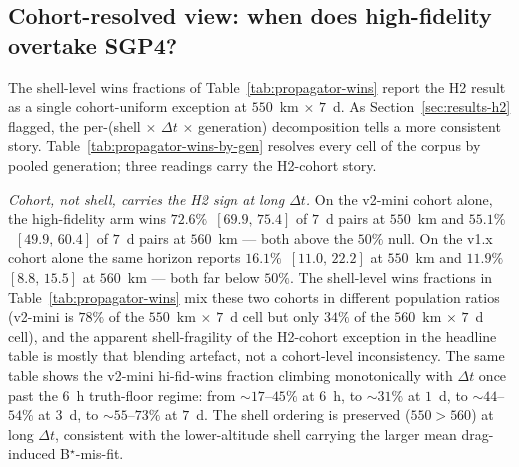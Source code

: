 \documentclass[10pt, letterpaper]{article}
\begin{document}
\subsection{Cohort-resolved view: when does high-fidelity overtake SGP4?}
\label{sec:discussion-v2mini}

The shell-level wins fractions of Table~\ref{tab:propagator-wins}
report the H2 result as a single cohort-uniform exception at
$550$~km $\times$ $7$~d. As Section~\ref{sec:results-h2} flagged,
the per-(shell $\times$ $\Delta t$ $\times$ generation)
decomposition tells a more consistent story.
Table~\ref{tab:propagator-wins-by-gen} resolves every cell of the
corpus by pooled generation; three readings carry the H2-cohort
story.

\begin{table}[ht]
  \centering
  \caption{Per-(shell $\times$ $\Delta t$ $\times$ pooled
  generation) hi-fid-vs-SGP4 win fractions on 3D L$_{2}$ and on
  the along-track component, with $95\%$ satellite-level
  bootstrap percentile CIs. Same construction as
  Table~\ref{tab:propagator-wins} but with the cohort axis
  exposed; cells with fewer than $30$ pairs are suppressed. The
  v2-mini cohort at $\Delta t = 7$~d clears $50\%$ at both
  populated shells, in contrast with the shell-level reading in
  Table~\ref{tab:propagator-wins}.}
  \label{tab:propagator-wins-by-gen}
  
\end{table}

\emph{Cohort, not shell, carries the H2 sign at long $\Delta t$.}
On the v2-mini cohort alone, the high-fidelity arm wins
$72.6\%$~$[69.9,\,75.4]$ of $7$~d pairs at $550$~km and
$55.1\%$~$[49.9,\,60.4]$ of $7$~d pairs at $560$~km --- both
above the $50\%$ null. On the v1.x cohort alone the same
horizon reports $16.1\%$~$[11.0,\,22.2]$ at $550$~km and
$11.9\%$~$[8.8,\,15.5]$ at $560$~km --- both far below
$50\%$. The shell-level wins fractions in
Table~\ref{tab:propagator-wins} mix these two cohorts in
different population ratios (v2-mini is $78\%$ of the $550$~km
$\times$ $7$~d cell but only $34\%$ of the $560$~km $\times$
$7$~d cell), and the apparent shell-fragility of the H2-cohort
exception in the headline table is mostly that
blending artefact, not a cohort-level inconsistency. The same
table shows the v2-mini hi-fid-wins fraction climbing
monotonically with $\Delta t$ once past the $6$~h
truth-floor regime: from $\sim 17$--$45\%$ at $6$~h, to
$\sim 31\%$ at $1$~d, to $\sim 44$--$54\%$ at $3$~d, to
$\sim 55$--$73\%$ at $7$~d. The shell ordering is preserved
($550 > 560$) at long $\Delta t$, consistent with the lower-altitude
shell carrying the larger mean drag-induced
B$^{\!\star}$-mis-fit.
\end{document}
